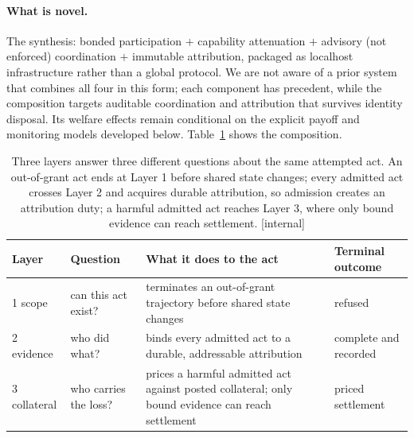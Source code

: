 \documentclass[11pt,a4paper]{article}
\theoremstyle{definition}
\theoremstyle{remark}
\begin{document}
\paragraph{What is novel.} The synthesis: bonded participation $+$ capability attenuation $+$ advisory (not enforced) coordination $+$ immutable attribution, packaged as localhost infrastructure rather than a global protocol. We are not aware of a prior system that combines all four in this form; each component has precedent, while the composition targets auditable coordination and attribution that survives identity disposal. Its welfare effects remain conditional on the explicit payoff and monitoring models developed below. Table~\ref{tab:bonded-three-layer} shows the composition.
\begin{table}[H]
\centering
\caption{Three layers answer three different questions about the same attempted act. An out-of-grant act ends at Layer 1 before shared state changes; every admitted act crosses Layer 2 and acquires durable attribution, so admission creates an attribution duty; a harmful admitted act reaches Layer 3, where only bound evidence can reach settlement. [internal]}
\label{tab:bonded-three-layer}
\small
\renewcommand{\arraystretch}{1.15}
\begin{tabularx}{\linewidth}{@{}l l >{\raggedright\arraybackslash}X l@{}}
\toprule
\textbf{Layer} & \textbf{Question} & \textbf{What it does to the act} & \textbf{Terminal outcome} \\
\midrule
1 scope & can this act exist? & terminates an out-of-grant trajectory before shared state changes & refused \\
2 evidence & who did what? & binds every admitted act to a durable, addressable attribution & complete and recorded \\
3 collateral & who carries the loss? & prices a harmful admitted act against posted collateral; only bound evidence can reach settlement & priced settlement \\
\bottomrule
\end{tabularx}
\end{table}
\end{document}
